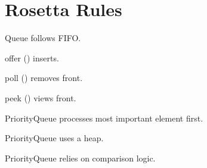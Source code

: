 \documentclass[11pt,a4paper]{book}
\begin{document}

\section{Rosetta Rules}

\begin{rosettarule}

Queue follows FIFO.\@

\end{rosettarule}


\begin{rosettarule}

offer () inserts.

\end{rosettarule}


\begin{rosettarule}

poll () removes front.

\end{rosettarule}


\begin{rosettarule}

peek () views front.
\end{rosettarule}


\begin{rosettarule}

PriorityQueue processes
most important element first.

\end{rosettarule}


\begin{rosettarule}

PriorityQueue uses a heap.

\end{rosettarule}


\begin{rosettarule}

PriorityQueue relies on
comparison logic.

\end{rosettarule}
\end{document}
